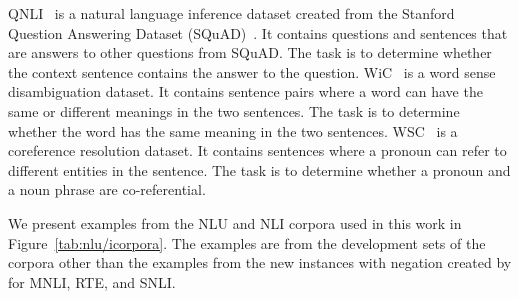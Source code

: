QNLI~\cite{rajpurkar-etal-2016-squad} is a natural language inference dataset 
created from the Stanford Question Answering Dataset (SQuAD)~\cite{rajpurkar-etal-2016-squad}.
It contains questions and sentences that are answers to other questions from SQuAD.
The task is to determine whether the context sentence contains the answer to the question.
WiC~\cite{pilehvar-camacho-collados-2019-wic} is a word sense disambiguation dataset.
It contains sentence pairs where a word can have the same or different meanings in the two sentences.
The task is to determine whether the word has the same meaning in the two sentences.
WSC~\cite{levesque_winograd_2012} is a coreference resolution dataset.
It contains sentences where a pronoun can refer to different entities in the sentence.
The task is to determine whether a pronoun and a noun phrase are co-referential.

We present examples from the NLU and NLI corpora used in this work in Figure~\ref{tab:nlu/icorpora}. 
The examples are from the development sets of the corpora 
other than the examples from the new instances with negation created by \citet{hossain-etal-2020-analysis} for MNLI, RTE, and SNLI.